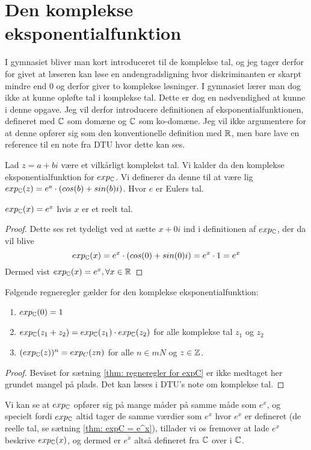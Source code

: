 \section{Den komplekse eksponentialfunktion}
I gymnasiet bliver man kort introduceret til de komplekse tal, og jeg tager derfor for givet at læseren kan løse en andengradsligning hvor diskriminanten er skarpt mindre end $0$ og derfor giver to komplekse løsninger. 
I gymnasiet lærer man dog ikke at kunne opløfte tal i komplekse tal. 
Dette er dog en nødvendighed at kunne i denne opgave. 
Jeg vil derfor introducere definitionen af eksponentialfunktionen, defineret med $\mathbb{C}$ som domæne og $\mathbb{C}$ som ko-domæne. 
Jeg vil ikke argumentere for at denne opfører sig som den konventionelle definition med $\mathbb{R}$, men bare lave en reference til en note fra DTU hvor dette kan ses. 

\begin{definition}\label{def: Den komplekse eksponentialfunktion}

Lad $z=a+bi$ være et vilkårligt komplekst tal. Vi kalder da den komplekse eksponentialfunktion for $exp_{\mathbb{C}}$. 
Vi definerer da denne til at være lig $exp_{\mathbb{C}} (z)=e^{a} \cdot (cos(b) + sin(b)i)$.
Hvor $e$ er Eulers tal. 
\end{definition}

\begin{thm}\label{thm: expC = e^x}
$exp_{\mathbb{C}} (x) = e^x$ hvis $x$ er et reelt tal. 
\end{thm}

\begin{proof}
Dette ses ret tydeligt ved at sætte $x+0i$ ind i definitionen af $exp_{\mathbb{C}}$, der da vil blive $$exp_{\mathbb{C}}(x) = e^x \cdot (cos(0)+sin(0)i)=e^x \cdot 1 = e^x$$
Dermed vist $exp_{\mathbb{C}} (x) = e^x, \forall x \in \mathbb{R}$
\end{proof}

\begin{thm}\label{thm: regneregler for expC}
Følgende regneregler gælder for den komplekse eksponentialfunktion:
\begin{enumerate}
	\item $exp_{\mathbb{C}} (0)=1$
	\item $exp_{\mathbb{C}} (z_1+z_2) = exp_{\mathbb{C}} (z_1) \cdot exp_{\mathbb{C}}(z_2)$ for alle komplekse tal $z_1$ og $z_2$
	\item $(exp_{\mathbb{C}} (z))^n = exp_C (zn)$ for alle $n\in mN$ og $z \in \mathbb{Z}$.
\end{enumerate}
\end{thm}

\begin{proof}
Beviset for sætning \ref{thm: regneregler for expC} er ikke medtaget her grundet mangel på plads. Det kan læses i DTU's note om komplekse tal. 
\end{proof}

Vi kan se at $exp_{\mathbb{C}}$ opfører sig på mange måder på samme måde som $e^x$, og specielt fordi $exp_{\mathbb{C}}$ altid tager de samme værdier som $e^x$ hvor $e^x$ er defineret (de reelle tal, se sætning \ref{thm: expC = e^x}), tillader vi os fremover at lade $e^x$ beskrive $exp_{\mathbb{C}} (x)$, og dermed er $e^x$ altså defineret fra $\mathbb{C}$ over i $\mathbb{C}$.